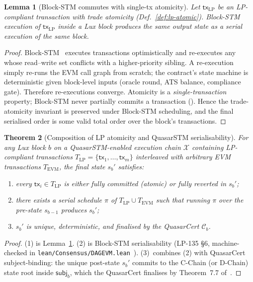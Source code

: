 \documentclass[11pt]{article}
\newtheorem{theorem}{Theorem}
\newtheorem{lemma}[theorem]{Lemma}
\begin{document}
\begin{lemma}[Block-STM commutes with single-tx atomicity]
\label{lem:bstm-atomic}
Let $\mathsf{tx}_{\mathrm{LP}}$ be an LP-compliant transaction with
trade atomicity (Def.~\ref{def:lp-atomic}).  Block-STM execution of
$\mathsf{tx}_{\mathrm{LP}}$ inside a Lux block produces the same
output state as a serial execution of the same block.
\end{lemma}

\begin{proof}
Block-STM~\cite{blockstm} executes transactions optimistically and
re-executes any whose read--write set conflicts with a higher-priority
sibling.  A re-execution simply re-runs the EVM call graph from
scratch; the  contract's state machine is
deterministic given block-level inputs (oracle round, ATS balance,
compliance gate).  Therefore re-executions converge.  Atomicity is a
\emph{single-transaction} property; Block-STM never partially commits
a transaction (\cite[Lemma 4.3]{blockstm}).  Hence the trade-atomicity
invariant is preserved under Block-STM scheduling, and the final
serialised order is some valid total order over the block's transactions.
\end{proof}

\begin{theorem}[Composition of LP atomicity and QuasarSTM serialisability]
\label{thm:compose}
For any Lux block $b$ on a QuasarSTM-enabled execution chain
$\mathcal{X}$ containing LP-compliant transactions
$T_{\mathrm{LP}} = \{\mathsf{tx}_1, \ldots, \mathsf{tx}_m\}$
interleaved with arbitrary EVM transactions $T_{\mathrm{EVM}}$, the
final state $s_b'$ satisfies:
\begin{enumerate}[nosep]
  \item every $\mathsf{tx}_i \in T_{\mathrm{LP}}$ is either fully
        committed (atomic) or fully reverted in $s_b'$;
  \item there exists a serial schedule $\pi$ of
        $T_{\mathrm{LP}} \cup T_{\mathrm{EVM}}$ such that running
        $\pi$ over the pre-state $s_{b-1}$ produces $s_b'$;
  \item $s_b'$ is unique, deterministic, and finalised by the
        QuasarCert $\mathcal{C}_b$.
\end{enumerate}
\end{theorem}

\begin{proof}
(1) is Lemma~\ref{lem:bstm-atomic}.  (2) is Block-STM serialisability
(LP-135 \S6, machine-checked in
\texttt{lean/Consensus/DAGEVM.lean}~\cite{dagevm-lean}).
(3)~combines (2) with QuasarCert subject-binding: the unique post-state
$s_b'$ commits to the C-Chain (or D-Chain) state root inside
$\mathsf{subj}_b$, which the QuasarCert finalises by
Theorem~7.7 of~\cite{quasar-cert}.
\end{proof}
\end{document}
